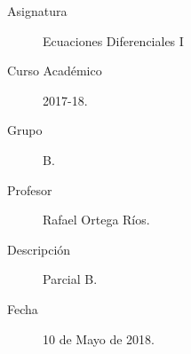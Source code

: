 \documentclass[12pt]{article}
\begin{document}

    
    

    \begin{description}
        \item[Asignatura] Ecuaciones Diferenciales I
        \item[Curso Académico] 2017-18.
        \item[Grupo] B.
        \item[Profesor] Rafael Ortega Ríos.
        \item[Descripción] Parcial B.
        \item[Fecha] 10 de Mayo de 2018.
    
    \end{description}
    \newpage
\end{document}
